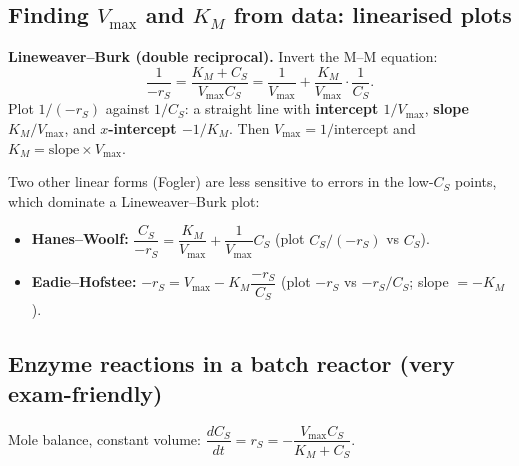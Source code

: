 \documentclass[11pt]{article}
\begin{document}
\subsection{Finding $V_{\max}$ and $K_M$ from data: linearised plots}
\textbf{Lineweaver--Burk (double reciprocal).} Invert the M--M equation:
\[
\frac{1}{-r_S}=\frac{K_M+C_S}{V_{\max}C_S}=\frac{1}{V_{\max}}+\frac{K_M}{V_{\max}}\cdot\frac{1}{C_S}.
\]
Plot $1/(-r_S)$ against $1/C_S$: a straight line with \textbf{intercept $1/V_{\max}$}, \textbf{slope $K_M/V_{\max}$}, and
\textbf{$x$-intercept $-1/K_M$}. Then $V_{\max}=1/\text{intercept}$ and $K_M=\text{slope}\times V_{\max}$.

\begin{center}
\end{center}

Two other linear forms (Fogler) are less sensitive to errors in the low-$C_S$ points, which dominate a
Lineweaver--Burk plot:
\begin{itemize}
\item \textbf{Hanes--Woolf:} $\dfrac{C_S}{-r_S}=\dfrac{K_M}{V_{\max}}+\dfrac{1}{V_{\max}}C_S$ \quad(plot $C_S/(-r_S)$ vs $C_S$).
\item \textbf{Eadie--Hofstee:} $-r_S=V_{\max}-K_M\dfrac{-r_S}{C_S}$ \quad(plot $-r_S$ vs $-r_S/C_S$; slope $=-K_M$).
\end{itemize}

\subsection{Enzyme reactions in a batch reactor (very exam-friendly)}
Mole balance, constant volume: $\dfrac{dC_S}{dt}=r_S=-\dfrac{V_{\max}C_S}{K_M+C_S}$.
\end{document}
